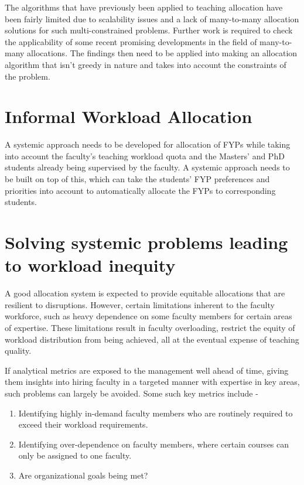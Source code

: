 The algorithms that have previously been applied to teaching allocation have been fairly limited due to scalability issues and a lack of many-to-many allocation solutions for such multi-constrained problems. Further work is required to check the applicability of some recent promising developments in the field of many-to-many allocations. The findings then need to be applied into making an allocation algorithm that isn't greedy in nature and takes into account the constraints of the problem.

\section{Informal Workload Allocation}

A systemic approach needs to be developed for allocation of FYPs while taking into account the faculty's teaching workload quota and the Masters' and PhD students already being supervised by the faculty. A systemic approach needs to be built on top of this, which can take the students' FYP preferences and priorities into account to automatically allocate the FYPs to corresponding students.

\section{Solving systemic problems leading to workload inequity}

A good allocation system is expected to provide equitable allocations that are resilient to disruptions. However, certain limitations inherent to the faculty workforce, such as heavy dependence on some faculty members for certain areas of expertise. These limitations result in faculty overloading, restrict the equity of workload distribution from being achieved, all at the eventual expense of teaching quality.

If analytical metrics are exposed to the management well ahead of time, giving them insights into hiring faculty in a targeted manner with expertise in key areas, such problems can largely be avoided. Some such key metrics include -
\begin{enumerate}
  \item Identifying highly in-demand faculty members who are routinely required to exceed their workload requirements.
  \item Identifying over-dependence on faculty members, where certain courses can only be assigned to one faculty.
  \item Are organizational goals being met?
\end{enumerate}

